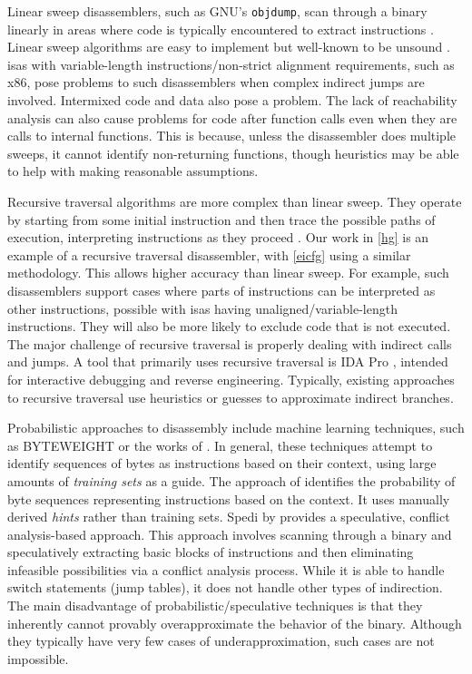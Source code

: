 Linear sweep disassemblers, such as GNU's
\lstinline|objdump|, scan through a binary linearly
in areas where code is typically encountered
to extract instructions \autocite{schwartz2002disassembly}.
Linear sweep algorithms are easy to implement but well-known to be unsound \autocite{schwartz2002disassembly}.
\Glspl{isa} with variable-length instructions/non-strict alignment requirements, such as \gls{x86}, pose problems to such disassemblers when complex indirect jumps are involved.
Intermixed code and data also pose a problem.
The lack of reachability analysis can also cause problems for code after function calls even when they are calls to internal functions.
This is because, unless the disassembler does multiple sweeps, it cannot identify non-returning functions, though heuristics may be able to help with making reasonable assumptions.

Recursive traversal algorithms are more complex than linear sweep.
They operate by starting from some initial instruction and then trace the possible paths of execution, interpreting instructions as they proceed \autocite{schwartz2002disassembly,kruegel2004static}.
Our work in \cref{hg} is an example of a recursive traversal disassembler, with \cref{eicfg} using a similar methodology.
This allows higher accuracy than linear sweep.
For example, such disassemblers support cases where parts of instructions can be interpreted as other instructions, possible with \glspl{isa} having unaligned/variable-length instructions.
They will also be more likely to exclude code that is not executed.
The major challenge of recursive traversal is properly dealing with indirect calls and jumps.
A tool that primarily uses recursive traversal is IDA Pro \autocite{ida}, intended for interactive debugging and reverse engineering.
Typically, existing approaches to recursive traversal use heuristics or guesses to approximate indirect branches.

Probabilistic approaches to disassembly \autocite{khadra2016speculative,miller2019probabilistic} include machine learning techniques, such as BYTEWEIGHT \autocite{bao2014byteweight} or the works of \textcite{wartell2011differentiating,wartell2014shingled}.
In general, these techniques attempt to identify sequences of bytes as instructions based on their context, using large amounts of \emph{training sets} as a guide.
The approach of \textcite{miller2019probabilistic} identifies the probability of byte sequences representing instructions based on the context.
It uses manually derived \emph{hints} rather than training sets.
Spedi by \textcite{khadra2016speculative} provides a speculative, conflict analysis-based approach.
This approach involves scanning through a binary and speculatively extracting basic blocks of instructions and then eliminating infeasible possibilities via a conflict analysis process.
While it is able to handle switch statements (jump tables), it does not handle other types of indirection.
The main disadvantage of probabilistic/speculative techniques is that they inherently cannot provably overapproximate the behavior of the binary.
Although they typically have very few cases of underapproximation, such cases are not impossible.

